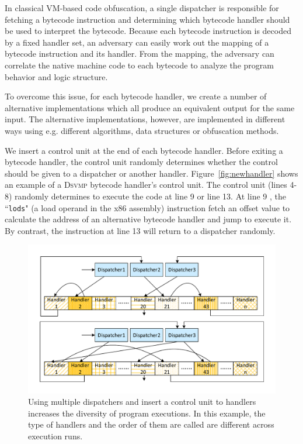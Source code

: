 \documentclass[times]{secauth}
\newcommand{\DSVMP}{\textsc{Dsvmp }}
\begin{document}
In classical VM-based code obfuscation, a single dispatcher is responsible for fetching a bytecode instruction and
determining which bytecode handler should be used to interpret the bytecode. Because each bytecode instruction
is decoded by a fixed handler set, an adversary can easily work out the mapping of a bytecode instruction and its
handler. From the mapping, the adversary can correlate the native machine code to each bytecode to analyze the
program behavior and logic structure.

To overcome this issue, for each bytecode handler, we create a number of alternative implementations which all
produce an equivalent output for the same input. The alternative implementations, however,
are implemented in different ways using e.g. different algorithms, data structures or obfuscation methods.

We insert a control unit at the end of each bytecode handler. Before exiting a bytecode handler,
the control unit randomly determines whether the control should be given to a dispatcher or
another handler. Figure~\ref{fig:newhandler} shows an example of a \DSVMP bytecode handler's control unit.
The control unit (lines 4-8) randomly determines to execute the code at line 9 or line 13.
At line 9 , the ``\texttt{lods}" (a load operand in the x86 assembly) instruction fetch an offset value
to calculate the address of an alternative bytecode handler and jump to execute it.
By contrast, the instruction at line 13 will return to a dispatcher randomly.


\begin{figure}[!t]
  \centering
  \includegraphics[width=1.0\columnwidth]{figure/figdh.pdf}
  \caption{Using multiple dispatchers and insert a control unit to handlers increases the diversity of program executions. In this example, the type of handlers and the order of them are called are different across execution runs. }\label{fig:Fig.3}
\end{figure}
\end{document}
